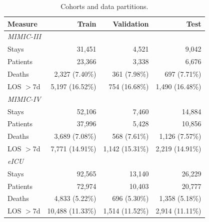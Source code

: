 \begin{table}[!t]
\centering\footnotesize
\setlength{\tabcolsep}{2pt}
\caption{Cohorts and data partitions.}
\label{tab:cohort}
\begin{tabular}{@{}lrrr@{}}
\toprule
Measure & Train & Validation & Test \\
\midrule
\multicolumn{4}{l}{\textit{MIMIC-III}} \\
Stays & 31,451 & 4,521 & 9,042 \\
Patients & 23,366 & 3,338 & 6,676 \\
Deaths & 2,327 (7.40\%) & 361 (7.98\%) & 697 (7.71\%) \\
LOS $>7$d & 5,197 (16.52\%) & 754 (16.68\%) & 1,490 (16.48\%) \\
\midrule
\multicolumn{4}{l}{\textit{MIMIC-IV}} \\
Stays & 52,106 & 7,460 & 14,884 \\
Patients & 37,996 & 5,428 & 10,856 \\
Deaths & 3,689 (7.08\%) & 568 (7.61\%) & 1,126 (7.57\%) \\
LOS $>7$d & 7,771 (14.91\%) & 1,142 (15.31\%) & 2,219 (14.91\%) \\
\midrule
\multicolumn{4}{l}{\textit{eICU}} \\
Stays & 92,565 & 13,140 & 26,229 \\
Patients & 72,974 & 10,403 & 20,777 \\
Deaths & 4,833 (5.22\%) & 696 (5.30\%) & 1,358 (5.18\%) \\
LOS $>7$d & 10,488 (11.33\%) & 1,514 (11.52\%) & 2,914 (11.11\%) \\
\bottomrule
\end{tabular}
\par{}
\end{table}

